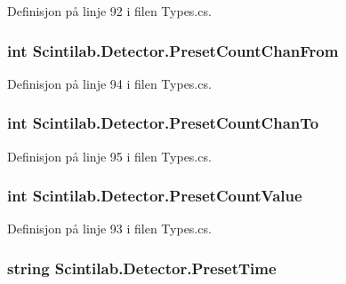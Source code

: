 Definisjon på linje 92 i filen Types.\+cs.

\hypertarget{class_scintilab_1_1_detector_a5ce2bf264c5973c9203a339260b0ac1b}{
\subsubsection[{Preset\+Count\+Chan\+From}]{\setlength{\rightskip}{0pt plus 5cm}int Scintilab.\+Detector.\+Preset\+Count\+Chan\+From}}\label{class_scintilab_1_1_detector_a5ce2bf264c5973c9203a339260b0ac1b}


Definisjon på linje 94 i filen Types.\+cs.

\hypertarget{class_scintilab_1_1_detector_a8c6bbd8aa7b67aca463d5f82c5933357}{
\subsubsection[{Preset\+Count\+Chan\+To}]{\setlength{\rightskip}{0pt plus 5cm}int Scintilab.\+Detector.\+Preset\+Count\+Chan\+To}}\label{class_scintilab_1_1_detector_a8c6bbd8aa7b67aca463d5f82c5933357}


Definisjon på linje 95 i filen Types.\+cs.

\hypertarget{class_scintilab_1_1_detector_ab0732d0c890144b9cefd26d4ebb0949a}{
\subsubsection[{Preset\+Count\+Value}]{\setlength{\rightskip}{0pt plus 5cm}int Scintilab.\+Detector.\+Preset\+Count\+Value}}\label{class_scintilab_1_1_detector_ab0732d0c890144b9cefd26d4ebb0949a}


Definisjon på linje 93 i filen Types.\+cs.

\hypertarget{class_scintilab_1_1_detector_a8d3d6f5bd3c9e99dd5b20a34b2bcb6cf}{
\subsubsection[{Preset\+Time}]{\setlength{\rightskip}{0pt plus 5cm}string Scintilab.\+Detector.\+Preset\+Time}}\label{class_scintilab_1_1_detector_a8d3d6f5bd3c9e99dd5b20a34b2bcb6cf}


